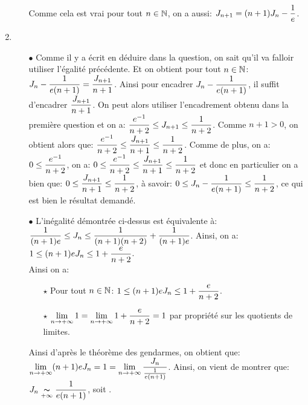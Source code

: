 \documentclass[a4paper, 11pt,reqno]{article}
\begin{document}
\begin{correction}
\begin{enumerate}
\begin{itemize}
			            Comme cela est vrai pour tout $n\in\mathbb{N}$, on a aussi: $J_{n+1}=(n+1)J_n-\displaystyle\frac{1}{e}$.
		      \end{itemize}
		\item
		      \begin{itemize}
			      \item[$\bullet$] Comme il y a \'ecrit en d\'eduire dans la question, on sait qu'il va falloir utiliser l'\'egalit\'e pr\'ec\'edente. Et on obtient pour tout $n\in\mathbb{N}$: $J_n-\displaystyle\frac{1}{e(n+1)}=\displaystyle\frac{J_{n+1}}{n+1}$. Ainsi pour encadrer $J_n-\displaystyle\frac{1}{e(n+1)}$, il suffit d'encadrer $\displaystyle\frac{J_{n+1}}{n+1}$. On peut alors utiliser l'encadrement obtenu dans la premi\`{e}re question et on a: $\displaystyle\frac{e^{-1}}{n+2}\leq J_{n+1} \leq \displaystyle\frac{1}{n+2}$. Comme $n+1>0$, on obtient alors que:
			            $\displaystyle\frac{e^{-1}}{n+2}\leq \displaystyle\frac{J_{n+1}}{n+1} \leq \displaystyle\frac{1}{n+2}$. Comme de plus, on a: $0\leq \displaystyle\frac{e^{-1}}{n+2}$, on  a: $0 \leq \displaystyle\frac{e^{-1}}{n+2} \leq \displaystyle\frac{J_{n+1}}{n+1} \leq \displaystyle\frac{1}{n+2}$ et donc en particulier on a bien que: $0 \leq \displaystyle\frac{J_{n+1}}{n+1} \leq \displaystyle\frac{1}{n+2}$, \`{a} savoir: $0 \leq  J_n-\displaystyle\frac{1}{e(n+1)}  \leq \displaystyle\frac{1}{n+2}$, ce qui est bien le r\'esultat demand\'e.
			      \item[$\bullet$] L'in\'egalit\'e d\'emontr\'ee ci-dessus est \'equivalente \`{a}: $\displaystyle\frac{1}{(n+1)e}\leq J_n\leq \displaystyle\frac{1}{(n+1)(n+2)}+\displaystyle\frac{1}{(n+1)e}$. Ainsi, on a: $1\leq (n+1)e J_n \leq 1+\displaystyle\frac{e}{n+2}$. \\
			            \noindent Ainsi on a:
			            \begin{itemize}
				            \item[$\star$] Pour tout $n\in\mathbb{N}$: $1\leq (n+1)e J_n \leq 1+\displaystyle\frac{e}{n+2}$.
				            \item[$\star$] $\lim\limits_{n\to +\infty} 1=\lim\limits_{n\to +\infty} 1+\displaystyle\frac{e}{n+2}=1$ par propri\'et\'e sur les quotients de limites.
			            \end{itemize}
			            Ainsi d'apr\`{e}s le th\'eor\`{e}me des gendarmes, on obtient que: $\lim\limits_{n\to +\infty} (n+1)e J_n=1=\lim\limits_{n\to +\infty} \displaystyle\frac{J_n}{\frac{1}{e(n+1)}}$. Ainsi, on vient de montrer que: $J_n\underset{+\infty}{ \thicksim} \displaystyle\frac{1}{e(n+1)}$, soit .
		      \end{itemize}
	\end{enumerate}
\end{correction}
\end{document}
